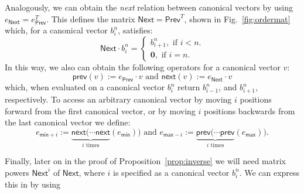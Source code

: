  
Analogously, we can obtain the \textit{next} relation between canonical vectors by using $e_{\mathsf{Next}} = e_{\mathsf{Prev}}^T$. This defines the matrix $\mathsf{Next}= \mathsf{Prev}^T$, shown in Fig.~\ref{fig:ordermat} which, for a canonical vector $b_i^n$, satisfies:
\[
{\mathsf{Next}}\cdot b_i^n=\begin{cases}
               b_{i+1}^n, \text{ if } i < n. \\
              \mathbf{0}, \text{ if } i = n.
            \end{cases}
\]
In this way, we also can obtain the following operators for a canonical vector $v$: 
$$\mathsf{prev}(v):=e_{\mathsf{Prev}}\cdot v \text{ and }
\mathsf{next}(v):=e_{\mathsf{Next}}\cdot v$$
which, when evaluated on a canonical vector $b_i^n$ return $b_{i-1}^n$, and $b_{i+1}^n$, respectively. 
To access an arbitrary canonical vector by moving $i$ positions forward from the first canonical vector, or by moving $i$ positions backwards from the last canonical vector we define:
\[
e_{\mathsf{min}+i}:=\underbrace{\mathsf{next}(\cdots \mathsf{next}}_{i\text{ times}}(e_{\mathsf{min}}))
\text{ and }
e_{\mathsf{max}-i}:=\underbrace{\mathsf{prev}(\cdots \mathsf{prev}}_{i\text{ times}}(e_{\mathsf{max}})).
\]
%

Finally, later on in the proof of Proposition~\ref{prop:inverse} we will need  matrix powers $\mathsf{Next}^i$ of $\mathsf{Next}$, where $i$ is specified as
a canonical vector $b_i^n$. We can express this in \langfor by using
%
  
